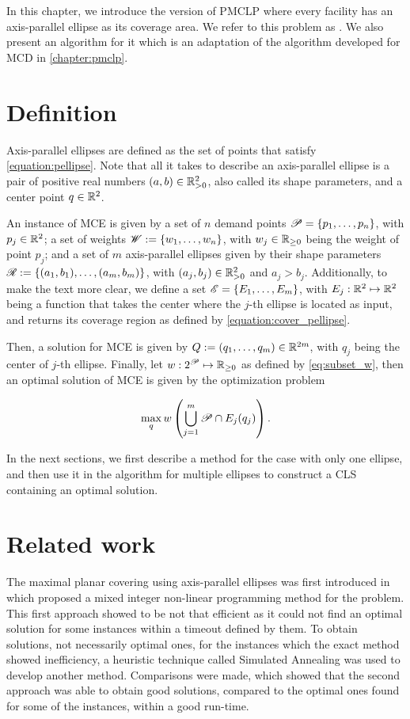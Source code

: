 In this chapter, we introduce the version of PMCLP where every 
facility has an axis-parallel ellipse as its coverage area. We refer to this problem as . We also present an algorithm for it which is an adaptation of the algorithm developed for MCD in \autoref{chapter:pmclp}.

\section{Definition}

Axis-parallel ellipses are defined as the set of points that satisfy \autoref{equation:pellipse}. Note that all it takes to describe an axis-parallel ellipse is a pair of positive real numbers $(a,b) \in \mathbb{R}_{>0}^2$, also called its shape parameters, and a center point $q \in \mathbb{R}^2$.

An instance of MCE is given by a set of $n$ demand points $\mathscr{P} = \{p_1, \dots, p_n\}$, with $p_j\in\mathbb{R}^2$; 
a set of weights $\mathscr{W}:=\{w_1, \dots, w_n\}$, with $w_j\in\mathbb{R}_{\ge0}$ being the weight of point $p_j$;
and a set of $m$ axis-parallel ellipses given by their shape parameters $\mathscr{R}:=\{(a_1, b_1), \dots, (a_m, b_m)\}$, with $(a_j, b_j)\in\mathbb{R}_{>0}^2$ and $a_j>b_j$.
Additionally, to make the text more clear, we define a set $\mathscr{E} = \{E_1, \dots, E_m\}$, with $E_j : \mathbb{R}^2 \mapsto \mathbb{R}^2$ being a function that takes the center where the $j$-th ellipse is located as input, and returns its coverage region as defined by \autoref{equation:cover_pellipse}.

Then, a solution for MCE is given by $Q:=(q_1, \dots, q_m)\in\mathbb{R}^{2m}$, with $q_j$ being the center of $j$-th ellipse. Finally, let $w : 2^{\mathscr{P}} \mapsto \mathbb{R}_{\ge0}$ as defined by \autoref{eq:subset_w}, then an optimal solution of MCE is given by the optimization problem

\begin{equation}
\max_q w\left(\bigcup_{j=1}^m \mathscr{P} \cap E_j(q_j)\right).
\end{equation}

In the next sections, we first describe a method for the case with only one ellipse, and then use it in the algorithm for multiple ellipses to construct a CLS containing an optimal solution.

\section{Related work}
The maximal planar covering using axis-parallel ellipses was first introduced in  which proposed a mixed integer non-linear programming method for the problem. This first approach showed to be not that efficient as it could not find an optimal solution for some instances within a timeout defined by them. To obtain solutions, not necessarily optimal ones, for the instances which the exact method showed inefficiency, a heuristic technique called Simulated Annealing was used to develop another method. Comparisons were made, which showed that the second approach was able to obtain good solutions, compared to the optimal ones found for some of the instances, within a good run-time.

